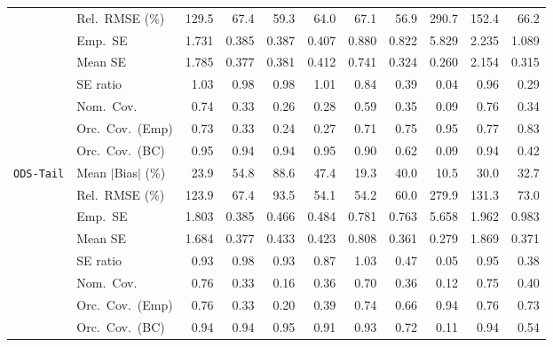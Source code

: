 \begin{landscape}
\begin{longtable}{llrrrrrrrrr}
 & Rel.\ RMSE (\%) & 129.5 & 67.4 & \cellcolor{ranktwo}59.3 & \cellcolor{rankthree}64.0 & 67.1 & \cellcolor{rankone}56.9 & 290.7 & 152.4 & 66.2 \\
 & Emp.\ SE & 1.731 & 0.385 & 0.387 & 0.407 & 0.880 & 0.822 & 5.829 & 2.235 & 1.089 \\
 & Mean SE & 1.785 & 0.377 & 0.381 & 0.412 & 0.741 & 0.324 & 0.260 & 2.154 & 0.315 \\
 & SE ratio & \cellcolor{rankthree}1.03 & \cellcolor{ranktwo}0.98 & \cellcolor{ranktwo}0.98 & \cellcolor{rankone}1.01 & 0.84 & 0.39 & 0.04 & 0.96 & 0.29 \\
 & Nom.\ Cov. & \cellcolor{ranktwo}0.74 & 0.33 & 0.26 & 0.28 & \cellcolor{rankthree}0.59 & 0.35 & 0.09 & \cellcolor{rankone}0.76 & 0.34 \\
 & Orc.\ Cov.\ (Emp) & 0.73 & 0.33 & 0.24 & 0.27 & 0.71 & 0.75 & \cellcolor{rankone}0.95 & \cellcolor{rankthree}0.77 & \cellcolor{ranktwo}0.83 \\
 & Orc.\ Cov.\ (BC) & \cellcolor{rankone}0.95 & \cellcolor{ranktwo}0.94 & \cellcolor{ranktwo}0.94 & \cellcolor{rankone}0.95 & \cellcolor{rankthree}0.90 & 0.62 & 0.09 & \cellcolor{ranktwo}0.94 & 0.42 \\
\addlinespace[2pt]
\quad \texttt{ODS-Tail} & Mean $|$Bias$|$ (\%) & \cellcolor{rankthree}23.9 & 54.8 & 88.6 & 47.4 & \cellcolor{ranktwo}19.3 & 40.0 & \cellcolor{rankone}10.5 & 30.0 & 32.7 \\
 & Rel.\ RMSE (\%) & 123.9 & 67.4 & 93.5 & \cellcolor{rankone}54.1 & \cellcolor{ranktwo}54.2 & \cellcolor{rankthree}60.0 & 279.9 & 131.3 & 73.0 \\
 & Emp.\ SE & 1.803 & 0.385 & 0.466 & 0.484 & 0.781 & 0.763 & 5.658 & 1.962 & 0.983 \\
 & Mean SE & 1.684 & 0.377 & 0.433 & 0.423 & 0.808 & 0.361 & 0.279 & 1.869 & 0.371 \\
 & SE ratio & 0.93 & \cellcolor{rankone}0.98 & 0.93 & 0.87 & \cellcolor{ranktwo}1.03 & 0.47 & 0.05 & \cellcolor{rankthree}0.95 & 0.38 \\
 & Nom.\ Cov. & \cellcolor{rankone}0.76 & 0.33 & 0.16 & 0.36 & \cellcolor{rankthree}0.70 & 0.36 & 0.12 & \cellcolor{ranktwo}0.75 & 0.40 \\
 & Orc.\ Cov.\ (Emp) & \cellcolor{ranktwo}0.76 & 0.33 & 0.20 & 0.39 & \cellcolor{rankthree}0.74 & 0.66 & \cellcolor{rankone}0.94 & \cellcolor{ranktwo}0.76 & 0.73 \\
 & Orc.\ Cov.\ (BC) & \cellcolor{ranktwo}0.94 & \cellcolor{ranktwo}0.94 & \cellcolor{rankone}0.95 & 0.91 & \cellcolor{rankthree}0.93 & 0.72 & 0.11 & \cellcolor{ranktwo}0.94 & 0.54 \\

\end{longtable}
\end{landscape}
